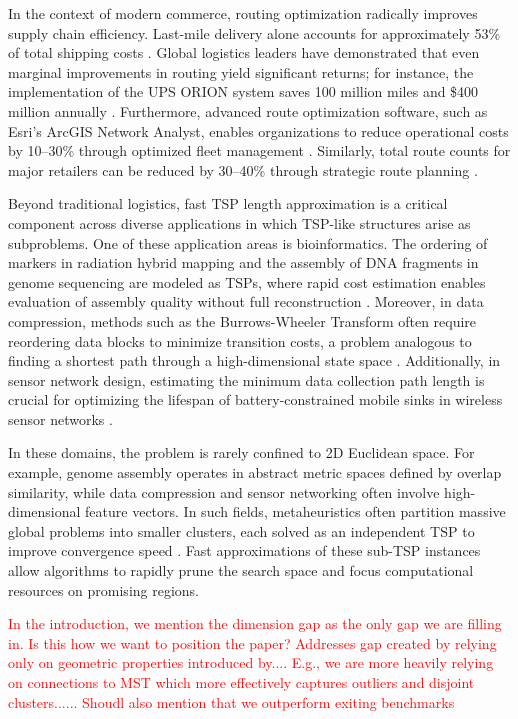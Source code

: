 \documentclass{article}
\begin{document}
In the context of modern commerce, routing optimization radically improves supply chain efficiency. Last-mile delivery alone accounts for approximately 53\% of total shipping costs \citep{finmile2025}. Global logistics leaders have demonstrated that even marginal improvements in routing yield significant returns; for instance, the implementation of the UPS ORION system saves 100 million miles and \$400 million annually \citep{holland2017ups}. Furthermore, advanced route optimization software, such as Esri's ArcGIS Network Analyst, enables organizations to reduce operational costs by 10--30\% through optimized fleet management \citep{esri2023network}. Similarly, total route counts for major retailers can be reduced by 30--40\% through strategic route planning \citep{finmile2025}.

Beyond traditional logistics, fast TSP length approximation is a critical component across diverse applications in which TSP-like structures arise as subproblems. One of these application areas is bioinformatics. The ordering of markers in radiation hybrid mapping and the assembly of DNA fragments in genome sequencing are modeled as TSPs, where rapid cost estimation enables evaluation of assembly quality without full reconstruction \citep{agarwala2000fast, manfrin2006parallel}.
Moreover, in data compression, methods such as the Burrows-Wheeler Transform often require reordering data blocks to minimize transition costs, a problem analogous to finding a shortest path through a high-dimensional state space \citep{lloyd1982}. 
Additionally, in sensor network design, estimating the minimum data collection path length is crucial for optimizing the lifespan of battery-constrained mobile sinks in wireless sensor networks \citep{wang2008}.

In these domains, the problem is rarely confined to 2D Euclidean space. For example, genome assembly operates in abstract metric spaces defined by overlap similarity, while data compression and sensor networking often involve high-dimensional feature vectors. In such fields, metaheuristics often partition massive global problems into smaller clusters, each solved as an independent TSP to improve convergence speed \citep{frontiers2021, aaai2023}. Fast approximations of these sub-TSP instances allow algorithms to rapidly prune the search space and focus computational resources on promising regions.

\textcolor{red}{In the introduction, we mention the dimension gap as the only gap we are filling in. Is this how we want to position the paper? Addresses gap created by relying only on geometric properties introduced by.... E.g., we are more heavily relying on connections to MST which more effectively captures outliers and disjoint clusters...... Shoudl also mention that we outperform exiting benchmarks}
\end{document}
